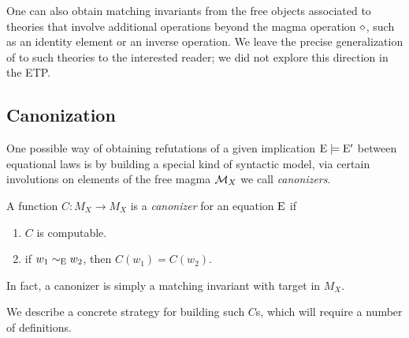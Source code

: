 \begin{remark}  One can also obtain matching invariants from the free objects associated to theories that involve additional operations beyond the magma operation $\diamond$, such as an identity element or an inverse operation.  We leave the precise generalization of  to such theories to the interested reader; we did not explore this direction in the ETP.
\end{remark}

\subsection{Canonization}\label{canon-sec}

One possible way of obtaining refutations of a given implication $\mathrm{E} \models \mathrm{E}'$ between equational laws is by building a special kind of syntactic model, via certain involutions on elements of the free magma ${\mathcal{M}}_X$ we call \emph{canonizers}.

\begin{definition}
  A function $C\colon M_X\rightarrow M_X$ is a \emph{canonizer} for an equation $\mathrm{E}$ if
  \setlength{\parskip}{0pt}
  \begin{enumerate}
    \item $C$ is computable.
    \item if $w_1\sim_{\mathrm{E}} w_2$, then $C(w_1) = C(w_2)$.
  \end{enumerate}
\end{definition}

In fact, a canonizer is simply a matching invariant with target in $M_X$.

We describe a concrete strategy for building such $C$s, which will require a number of definitions.


